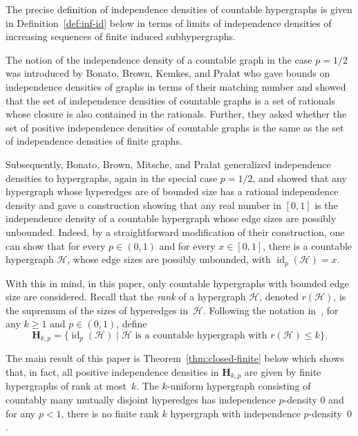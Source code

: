\documentclass[11pt,reqno]{amsart}
\theoremstyle{definition}
\begin{document}
The precise definition of independence densities of countable hypergraphs is given in Definition~\ref{def:inf-id} below in terms of limits of independence densities of increasing sequences of finite induced subhypergraphs.

The notion of the independence density of a countable graph in the case $p = 1/2$ was introduced by Bonato, Brown, Kemkes, and Pra{\l}at \cite{BBKP11} who gave bounds on independence densities of graphs in terms of their matching number and showed that the set of independence densities of countable graphs is a set of rationals whose closure is also contained in the rationals. Further, they asked whether the set of positive independence densities of countable graphs is the same as the set of independence densities of finite graphs.

Subsequently, Bonato, Brown, Mitsche, and Pra{\l}at \cite{BBMP14} generalized independence densities to hypergraphs, again in the special case $p = 1/2$, and showed that any hypergraph whose hyperedges are of bounded size has a rational independence density and gave a construction showing that any real number in $[0,1]$ is the independence density of a countable hypergraph whose edge sizes are possibly unbounded.  Indeed, by a straightforward modification of their construction, one can show that for every $p \in (0,1)$ and for every $x \in [0,1]$, there is a countable hypergraph $\mathcal{H}$, whose edge sizes are possibly unbounded, with ${\operatorname{id}}_p(\mathcal{H}) = x$.

With this in mind, in this paper, only countable hypergraphs with bounded edge size are considered. Recall that the \emph{rank} of a hypergraph $\mathcal{H}$, denoted $r(\mathcal{H})$, is the supremum of the sizes of hyperedges in~$\mathcal{H}$. Following the notation in~\cite{BBMP14}, for any $k \geq 1$ and $p \in (0,1)$, define
\begin{equation}\label{eq:set-of-id}
 \mathbf{H}_{k, p} = \{{\operatorname{id}}_p(\mathcal{H}) \mid \mathcal{H} \text{ is a countable hypergraph with } r(\mathcal{H}) \leq k\}.
\end{equation}

The main result of this paper is Theorem~\ref{thm:closed-finite} below which shows that, in fact, all positive independence densities in $\mathbf{H}_{k, p}$ are given by finite hypergraphs of  rank at most~$k$. The $k$-uniform hypergraph consisting of countably many mutually disjoint hyperedges has independence $p$-density $0$ and for any $p < 1$, there is no finite rank $k$ hypergraph with independence $p$-density~$0$.
\end{document}
